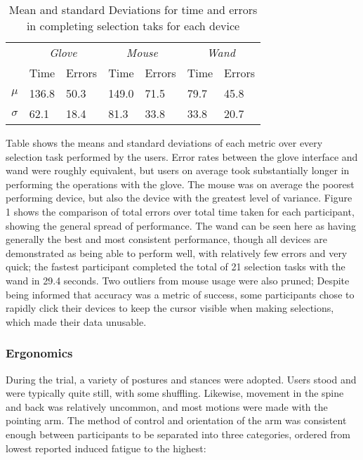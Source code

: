 \begin{table}
\centering
\begin{tabular}{c | l l | l l | l l }
\hline
 & \multicolumn{2}{c|}{\emph{Glove}} & \multicolumn{2}{c|}{\emph{Mouse}} & \multicolumn{2}{c|}{\emph{Wand}} \\
 & Time & Errors & Time & Errors & Time & Errors  \\
$\mu$ & 136.8 & 50.3 & 149.0 & 71.5 & 79.7 & 45.8 \\
$\sigma$ & 62.1 & 18.4 & 81.3 & 33.8 & 33.8 & 20.7 \\
\hline
\end{tabular}
\caption{Mean and standard Deviations for time and errors in completing selection taks for each device}
\end{table}

Table  shows the means and standard deviations of each metric over every selection task performed by the users. Error rates between the glove interface and wand were roughly equivalent, but users on average took substantially longer in performing the operations with the glove. The mouse was on average the poorest performing device, but also the device with the greatest level of variance. Figure 1 shows the comparison of total errors over total time taken for each participant, showing the general spread of performance. The wand can be seen here as having generally the best and most consistent performance, though all devices are demonstrated as being able to perform well, with relatively few errors and very quick; the fastest participant completed the total of 21 selection tasks with the wand in 29.4 seconds. Two outliers from mouse usage were also pruned; Despite being informed that accuracy was a metric of success, some participants chose to rapidly click their devices to keep the cursor visible when making selections, which made their data unusable.


\subsubsection{Ergonomics}

During the trial, a variety of postures and stances were adopted. Users stood and were typically quite still, with some shuffling. Likewise, movement in the spine and back was relatively uncommon, and most motions were made with the pointing arm. The method of control and orientation of the arm was consistent enough between participants to be separated into three categories, ordered from lowest reported induced fatigue to the highest:


